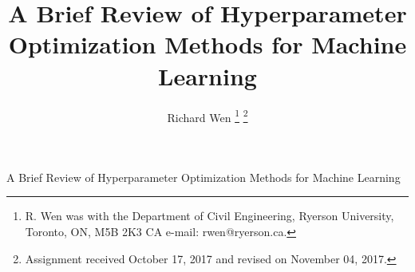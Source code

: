 

\title{A Brief Review of Hyperparameter Optimization Methods for Machine Learning}




\author{Richard Wen%
\thanks{R. Wen was with the Department of Civil Engineering, Ryerson University, Toronto, ON, M5B 2K3 CA e-mail: rwen@ryerson.ca.}%
\thanks{Assignment received October 17, 2017 and revised on November 04, 2017.}}




%
{A Brief Review of Hyperparameter Optimization Methods for Machine Learning}






\maketitle

